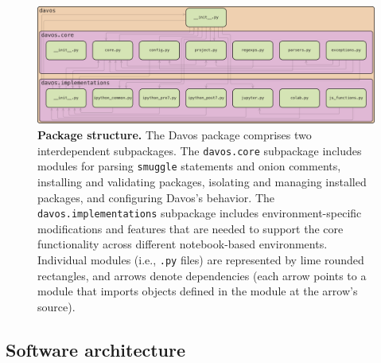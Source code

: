 \documentclass[preprint,12pt,a4paper]{elsarticle}
\begin{document}
\begin{figure}[tp]
\centering
\includegraphics[width=\textwidth]{figs/package_structure}
\caption{\small \textbf{Package structure.} The Davos package
  comprises two interdependent subpackages.  The \texttt{davos.core}
  subpackage includes modules for parsing \texttt{smuggle} statements
  and onion comments, installing and validating packages, isolating and managing
  installed packages, and configuring Davos's behavior.  The
  \texttt{davos.implementations} subpackage includes
  environment-specific modifications and features that are needed to
  support the core functionality across different notebook-based
  environments.  Individual modules (i.e., \texttt{.py} files) are represented by lime
  rounded rectangles, and arrows denote dependencies (each arrow
  points to a module that imports objects defined in the module at the
  arrow's source).}
\label{fig:package-structure}
\end{figure}


\subsection{Software architecture}\label{sec:architecture}
\end{document}

